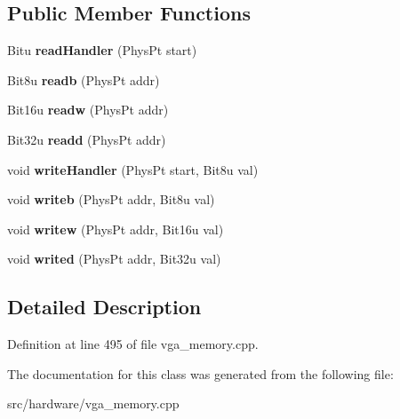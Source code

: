 \subsection*{Public Member Functions}
\begin{DoxyCompactItemize}
\item 
\hypertarget{classVGA__UnchainedVGA__Handler_a5de9a4081506d1b355ee928fa4e31201}{Bitu {\bfseries read\-Handler} (Phys\-Pt start)}\label{classVGA__UnchainedVGA__Handler_a5de9a4081506d1b355ee928fa4e31201}

\item 
\hypertarget{classVGA__UnchainedVGA__Handler_a2a9b156a0b7964f47a0903470b75f245}{Bit8u {\bfseries readb} (Phys\-Pt addr)}\label{classVGA__UnchainedVGA__Handler_a2a9b156a0b7964f47a0903470b75f245}

\item 
\hypertarget{classVGA__UnchainedVGA__Handler_ae6fa9f23f827f805fc94185b2eded25c}{Bit16u {\bfseries readw} (Phys\-Pt addr)}\label{classVGA__UnchainedVGA__Handler_ae6fa9f23f827f805fc94185b2eded25c}

\item 
\hypertarget{classVGA__UnchainedVGA__Handler_a5ffd0e7cb069590a33fbb478b79b1380}{Bit32u {\bfseries readd} (Phys\-Pt addr)}\label{classVGA__UnchainedVGA__Handler_a5ffd0e7cb069590a33fbb478b79b1380}

\item 
\hypertarget{classVGA__UnchainedVGA__Handler_a2ff44c0c054b1aa0697374ae2fca666a}{void {\bfseries write\-Handler} (Phys\-Pt start, Bit8u val)}\label{classVGA__UnchainedVGA__Handler_a2ff44c0c054b1aa0697374ae2fca666a}

\item 
\hypertarget{classVGA__UnchainedVGA__Handler_a6c1fa72909d6d784980f88e560a945f6}{void {\bfseries writeb} (Phys\-Pt addr, Bit8u val)}\label{classVGA__UnchainedVGA__Handler_a6c1fa72909d6d784980f88e560a945f6}

\item 
\hypertarget{classVGA__UnchainedVGA__Handler_ad49414bf345e6806ecf02b5740cd5022}{void {\bfseries writew} (Phys\-Pt addr, Bit16u val)}\label{classVGA__UnchainedVGA__Handler_ad49414bf345e6806ecf02b5740cd5022}

\item 
\hypertarget{classVGA__UnchainedVGA__Handler_aa10072aef1761c10487ee5b97d1b1af2}{void {\bfseries writed} (Phys\-Pt addr, Bit32u val)}\label{classVGA__UnchainedVGA__Handler_aa10072aef1761c10487ee5b97d1b1af2}

\end{DoxyCompactItemize}


\subsection{Detailed Description}


Definition at line 495 of file vga\-\_\-memory.\-cpp.



The documentation for this class was generated from the following file\-:\begin{DoxyCompactItemize}
\item 
src/hardware/vga\-\_\-memory.\-cpp\end{DoxyCompactItemize}
